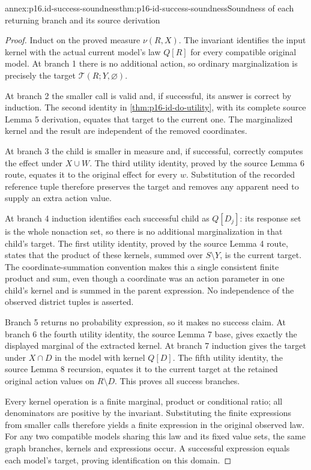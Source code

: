 \begin{annexitem}{annex:p16.id-success-soundness}{thm:p16-id-success-soundness}{Soundness of each returning branch and its source derivation}
\begin{proof}
Induct on the proved measure \(\nu(R,X)\). The invariant identifies
the input kernel with the actual current model's law \(Q[R]\)
for every compatible original model. At branch 1 there is no
additional action, so ordinary marginalization is precisely the
target \(\mathcal T(R;Y,\varnothing)\).

At branch 2 the smaller call is valid and, if successful, its answer
is correct by induction. The second identity in
\cref{thm:p16-id-do-utility}, with its complete source Lemma 5
derivation, equates that target to the current one. The marginalized
kernel and the result are independent of the removed coordinates.

At branch 3 the child is smaller in measure and, if successful,
correctly computes the effect under \(X\cup W\). The third
utility identity, proved by the source Lemma 6 route, equates it
to the original effect for every \(w\). Substitution of the
recorded reference tuple therefore preserves the target and removes
any apparent need to supply an extra action value.

At branch 4 induction identifies each successful child as
\(Q[D_j]\): its response set is the whole nonaction set, so
there is no additional marginalization in that child's target.
The first utility identity, proved by the source Lemma 4 route,
states that the product of these kernels, summed over \(S\setminus Y\),
is the current target. The coordinate-summation convention makes
this a single consistent finite product and sum, even though a
coordinate was an action parameter in one child's kernel and is
summed in the parent expression. No independence of the observed
district tuples is asserted.

Branch 5 returns no probability expression, so it makes no success
claim. At branch 6 the fourth utility identity, the source Lemma 7
base, gives exactly the displayed marginal of the extracted kernel.
At branch 7 induction gives the target under \(X\cap D\) in
the model with kernel \(Q[D]\). The fifth utility identity,
the source Lemma 8 recursion, equates it to the current target at
the retained original action values on \(R\setminus D\).
This proves all success branches.

Every kernel operation is a finite marginal, product or conditional
ratio; all denominators are positive by the invariant. Substituting
the finite expressions from smaller calls therefore yields a finite
expression in the original observed law. For any two compatible
models sharing this law and its fixed value sets, the same graph
branches, kernels and expressions occur. A successful expression
equals each model's target, proving identification on this domain.


\end{proof}
\end{annexitem}
